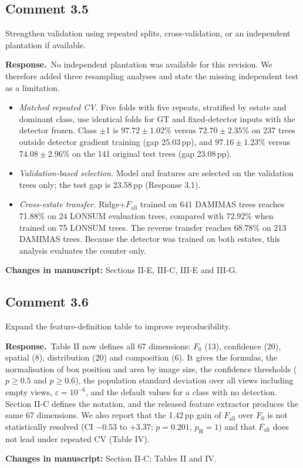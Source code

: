 \documentclass[10pt,a4paper]{article}
\newcommand{\resp}{\textbf{Response.}\ }
\newcommand{\changes}[1]{\par\textbf{Changes in manuscript:} #1}
\newcommand{\pH}{p_{\mathrm{H}}}
\newcommand{\Fall}{F_{\text{all}}}
\newcommand{\pp}{\,pp}
\begin{document}
\subsection{Comment 3.5}
\begin{cmt}
Strengthen validation using repeated splits, cross-validation, or an independent
plantation if available.
\end{cmt}
\resp No independent plantation was available for this revision. We therefore added
three resampling analyses and state the missing independent test as a limitation.
\begin{itemize}
\item \emph{Matched repeated CV.} Five folds with five repeats, stratified by estate and
  dominant class, use identical folds for GT and fixed-detector inputs with the
  detector frozen. Class $\pm$1 is $97.72\pm1.02$\% versus $72.70\pm2.35$\% on 237 trees
  outside detector gradient training (gap 25.03\pp), and $97.16\pm1.23$\% versus
  $74.08\pm2.96$\% on the 141 original test trees (gap 23.08\pp).
\item \emph{Validation-based selection.} Model and features are selected on the
  validation trees only; the test gap is 23.58\pp{} (Response 3.1).
\item \emph{Cross-estate transfer.} Ridge$+\Fall$ trained on 641 DAMIMAS trees reaches
  71.88\% on 24 LONSUM evaluation trees, compared with 72.92\% when trained on 75
  LONSUM trees. The reverse transfer reaches 68.78\% on 213 DAMIMAS trees. Because the
  detector was trained on both estates, this analysis evaluates the counter only.
\end{itemize}
\changes{Sections II-E, III-C, III-E and III-G.}

\subsection{Comment 3.6}
\begin{cmt}
Expand the feature-definition table to improve reproducibility.
\end{cmt}
\resp Table II now defines all 67 dimensions: $F_0$ (13), confidence (20), spatial (8),
distribution (20) and composition (6). It gives the formulas, the normalisation of box
position and area by image size, the confidence thresholds ($p\geq0.5$ and $p\geq0.6$),
the population standard deviation over all views including empty views,
$\varepsilon=10^{-6}$, and the default values for a class with no detection. Section II-C
defines the notation, and the released feature extractor produces the same 67
dimensions. We also report that the 1.42\pp{} gain of $\Fall$ over $F_0$ is not
statistically resolved (CI $-0.53$ to $+3.37$; $p=0.201$, $\pH=1$) and that $\Fall$ does
not lead under repeated CV (Table IV).
\changes{Section II-C; Tables II and IV.}
\end{document}

